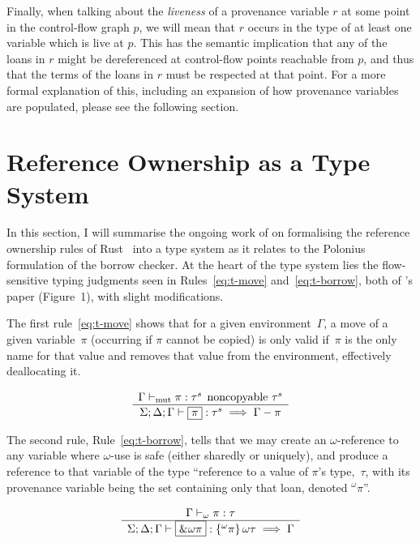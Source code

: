 \documentclass[11pt,a4paper,twoside,openany]{report}
\newcommand{\expression}[1]{\boxed{#1}}
\newcommand{\ntyperule}[2]{\begin{array}{c}#1\\\hline\raisebox{1pt}{\strut}#2\end{array}}
\begin{document}
Finally, when talking about the \emph{liveness} of a provenance variable $r$ at
some point in the control-flow graph $p$, we will mean that $r$ occurs in the
type of at least one variable which is live at $p$. This has the semantic
implication that any of the loans in $r$ might be dereferenced at control-flow
points reachable from $p$, and thus that the terms of the loans in $r$ must be
respected at that point. For a more formal explanation of this, including an
expansion of how provenance variables are populated, please see the following
section.

\section{Reference Ownership as a Type System}\label{sec:type-system}

In this section, I will summarise the ongoing work of
\citeauthor{weiss_oxide:_2019} on formalising the reference ownership rules of
Rust~\cite{weiss_oxide:_2019} into a type system as it relates to the Polonius
formulation of the borrow checker. At the heart of the type system lies the
flow-sensitive typing judgments seen in Rules~\ref{eq:t-move}
and~\ref{eq:t-borrow}, both of \citeauthor{weiss_oxide:_2019}'s paper
(Figure~1), with slight modifications.

The first rule~\eqref{eq:t-move} shows that for a given environment~$\Gamma$, a
move of a given variable~$\pi$ (occurring if $\pi$ cannot be copied) is only
valid if~$\pi$ is the only name for that value and removes that value from the
environment, effectively deallocating it.

\begin{equation}\label{eq:t-move}
  \ntyperule{\Gamma \vdash_{\text{mut}} \pi : \tau^s \:\: \text{noncopyable } \tau^s}{\Sigma ; \Delta ; \Gamma \vdash \expression{\pi} : \tau^s \implies \Gamma - \pi}
  \end{equation}

  The second rule, Rule~\eqref{eq:t-borrow}, tells that we may create an
  $\omega$-reference to any variable where $\omega$-use is safe (either sharedly
  or uniquely), and produce a reference to that variable of the type ``reference
  to a value of $\pi$'s type,~$\tau$, with its provenance variable being the set
  containing only that loan, denoted $^{\omega}\pi$''.

\begin{equation}\label{eq:t-borrow}
  \ntyperule{\Gamma \vdash_{\omega} \pi : \tau}{\Sigma ; \Delta ; \Gamma \vdash \expression{\&\omega \pi} : \left \{ ^{\omega}\pi\right \} \omega \tau \implies \Gamma}
\end{equation}
\end{document}
